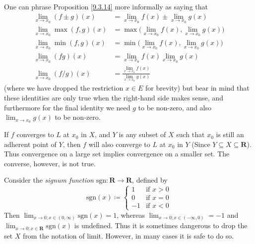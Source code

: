 \begin{remark}\label{9.3.15}
    One can phrase Proposition \ref{9.3.14} more informally as saying that
    \begin{align*}
        \lim_{x \to x_0} (f \pm g)(x)  & = \lim_{x \to x_0} f(x) \pm \lim_{x \to x_0} g(x)              \\
        \lim_{x \to x_0} \max(f, g)(x) & = \max\bigg(\lim_{x \to x_0} f(x), \lim_{x \to x_0} g(x)\bigg) \\
        \lim_{x \to x_0} \min(f, g)(x) & = \min\bigg(\lim_{x \to x_0} f(x), \lim_{x \to x_0} g(x)\bigg) \\
        \lim_{x \to x_0} (fg)(x)       & = \lim_{x \to x_0} f(x) \lim_{x \to x_0} g(x)                  \\
        \lim_{x \to x_0} (f / g)(x)    & = \frac{\lim_{x \to x_0} f(x)}{\lim_{x \to x_0} g(x)}
    \end{align*}
    (where we have dropped the restriction \(x \in E\) for brevity)
    but bear in mind that these identities are only true when the right-hand side makes sense, and furthermore for the final identity we need \(g\) to be non-zero, and also \(\lim_{x \to x_0} g(x)\) to be non-zero.
\end{remark}

\begin{note}
    If \(f\) converges to \(L\) at \(x_0\) in \(X\), and \(Y\) is any subset of \(X\) such that \(x_0\) is still an adherent point of \(Y\), then \(f\) will also converge to \(L\) at \(x_0\) in \(Y\)
    (Since \(Y \subseteq X \subseteq \mathbf{R}\)).
    Thus convergence on a large set implies convergence on a smaller set.
    The converse, however, is not true.
\end{note}

\begin{example}\label{9.3.16}
    Consider the \emph{signum function} \(\text{sgn} : \mathbf{R} \to \mathbf{R}\), defined by
    \[
        \text{sgn}(x) \coloneqq \begin{cases}
            1  & \text{if } x > 0 \\
            0  & \text{if } x = 0 \\
            -1 & \text{if } x < 0
        \end{cases}
    \]
    Then \(\lim_{x \to 0 ; x \in (0, \infty)} \text{sgn}(x) = 1\), whereas \(\lim_{x \to 0 ; x \in (-\infty, 0)} = -1\) and \(\lim_{x \to 0 ; x \in \mathbf{R}} \text{sgn}(x)\) is undefined.
    Thus it is sometimes dangerous to drop the set \(X\) from the notation of limit.
    However, in many cases it is safe to do so.
\end{example}

